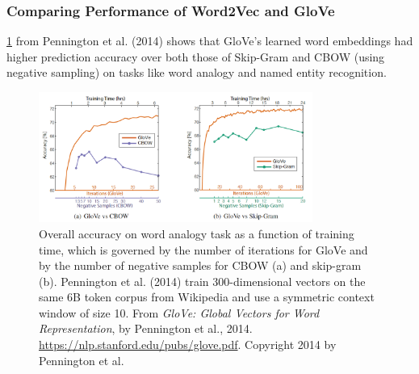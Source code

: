 \subsubsection{Comparing Performance of Word2Vec and GloVe}

\cref{fig:gloveVsWord2vec} from Pennington et al. (2014) shows that GloVe's learned word embeddings had higher prediction accuracy over both those of Skip-Gram and CBOW (using negative sampling) on tasks like word analogy and named entity recognition. 

\begin{figure}[h]
\vspace{-5pt}
\centering
\includegraphics[width=0.8\textwidth]{imgs/table_gloveVSword2vec.png}
\vspace{-5pt}
\caption{\footnotesize Overall accuracy on word analogy task as a function of training time, which is governed by the number of iterations for GloVe and by the number of negative samples for CBOW (a) and skip-gram (b). Pennington et al. (2014) train 300-dimensional vectors on the same 6B token corpus from Wikipedia and use a symmetric context window of size 10. From \emph{GloVe: Global Vectors for Word Representation}, by Pennington et al., 2014. \url{https://nlp.stanford.edu/pubs/glove.pdf}. Copyright 2014 by Pennington et al.}
\vspace{-5pt}
\label{fig:gloveVsWord2vec}
\end{figure}